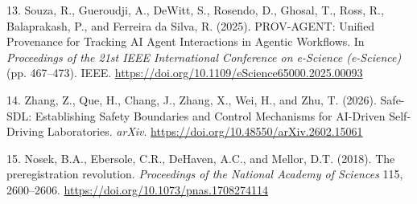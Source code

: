 \documentclass[
  english,
]{article}
\begin{document}
{13.} Souza, R., Gueroudji, A., DeWitt, S., Rosendo, D., Ghosal, T., Ross, R., Balaprakash, P., and Ferreira da Silva, R. (2025). PROV-AGENT: Unified Provenance for Tracking AI Agent Interactions in Agentic Workflows. In \emph{Proceedings of the 21st IEEE International Conference on e-Science (e-Science)} (pp. 467--473). IEEE. \url{https://doi.org/10.1109/eScience65000.2025.00093}

{14.} Zhang, Z., Que, H., Chang, J., Zhang, X., Wei, H., and Zhu, T. (2026). Safe-SDL: Establishing Safety Boundaries and Control Mechanisms for AI-Driven Self-Driving Laboratories. \emph{arXiv}. \url{https://doi.org/10.48550/arXiv.2602.15061}

{15.} Nosek, B.A., Ebersole, C.R., DeHaven, A.C., and Mellor, D.T. (2018). The preregistration revolution. \emph{Proceedings of the National Academy of Sciences} 115, 2600--2606. \url{https://doi.org/10.1073/pnas.1708274114}
\end{document}
